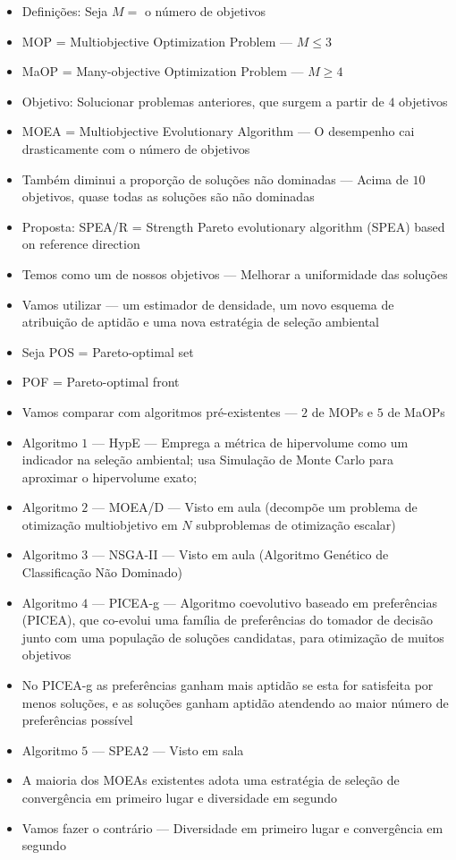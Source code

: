 \documentclass{rbfin}
\begin{document}
\begin{itemize}
  \item Definições: Seja $M=$ o número de objetivos
  \item MOP = Multiobjective Optimization Problem --- $M \le 3$
  \item MaOP = Many-objective Optimization Problem --- $M \ge 4$
  \item Objetivo: Solucionar problemas anteriores, que surgem a partir de $4$ objetivos
  \item MOEA = Multiobjective Evolutionary Algorithm --- O desempenho cai drasticamente com o número de objetivos
  \item Também diminui a proporção de soluções não dominadas --- Acima de $10$ objetivos, quase todas as soluções são não dominadas
  \item Proposta: SPEA/R = Strength Pareto evolutionary algorithm (SPEA) based on reference direction
  \item Temos como um de nossos objetivos --- Melhorar a uniformidade das soluções
  \item Vamos utilizar --- um estimador de densidade, um novo esquema de atribuição de aptidão e uma nova estratégia de seleção ambiental
  \item Seja POS = Pareto-optimal set
  \item POF = Pareto-optimal front
  \item Vamos comparar com algoritmos pré-existentes --- $2$ de MOPs e $5$ de MaOPs
  \item Algoritmo $1$ --- HypE --- Emprega a métrica de hipervolume como um indicador na seleção ambiental; usa Simulação de Monte Carlo para aproximar o hipervolume exato;
  \item Algoritmo $2$ --- MOEA/D --- Visto em aula (decompõe um problema de otimização multiobjetivo em $N$ subproblemas de otimização escalar)
  \item Algoritmo $3$ --- NSGA-II --- Visto em aula (Algoritmo Genético de Classificação Não Dominado)
  \item Algoritmo $4$ --- PICEA-g --- Algoritmo coevolutivo baseado em preferências (PICEA), que co-evolui uma família de preferências do tomador de decisão junto com uma população de soluções candidatas, para otimização de muitos objetivos
  \item No PICEA-g as preferências ganham mais aptidão se esta for satisfeita por menos soluções, e as soluções ganham aptidão atendendo ao maior número de preferências possível
  \item Algoritmo $5$ --- SPEA2 --- Visto em sala
  \item A maioria dos MOEAs existentes adota uma estratégia de seleção de convergência em primeiro lugar e diversidade em segundo
  \item Vamos fazer o contrário --- Diversidade em primeiro lugar e convergência em segundo
\end{itemize}
\end{document}
